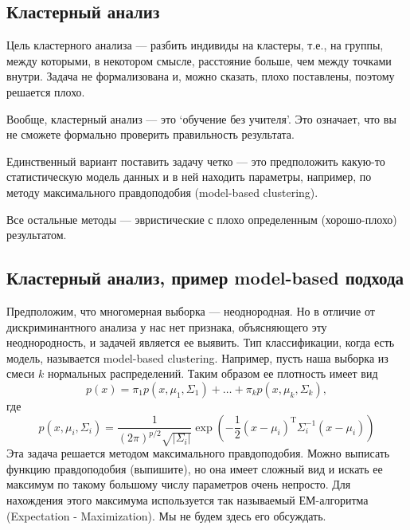 \subsection{Кластерный анализ}

Цель кластерного анализа --- разбить индивиды на кластеры, т.е., на группы, между которыми, в некотором смысле,
расстояние больше, чем между точками внутри. Задача не формализована и, можно сказать, плохо поставлены,
 поэтому решается плохо.

Вообще, кластерный анализ --- это `обучение без учителя'. Это означает, что вы не сможете формально проверить правильность результата.

Единственный вариант поставить задачу четко --- это предположить какую-то статистическую модель данных и в ней находить
параметры, например, по методу максимального правдоподобия  (model-based clustering).

Все остальные методы --- эвристические с плохо определенным (хорошо-плохо) результатом.

\subsection{Кластерный	анализ,	пример	model-based	подхода}

Предположим, что многомерная выборка --- неоднородная. Но в отличие от дискриминантного анализа у нас нет признака, объясняющего эту неоднородность, и задачей является ее выявить.
Тип классификации, когда есть модель, называется model-based clustering.
Например, пусть наша выборка из смеси $k$ нормальных распределений. Таким образом ее плотность имеет вид
\begin{equation}
p(x) = \pi_1 p(x, \mu_1, \Sigma_1) + \ldots + \pi_k p(x, \mu_k, \Sigma_k),
\end{equation}
где
\begin{equation}
p(x, \mu_i, \Sigma_i) = \frac{1}{(2\pi)^{p/2}\sqrt{|\Sigma_i|}}
\exp \left(-\frac{1}{2}(x - \mu_i)^\mathrm{T}\Sigma_i^{-1}(x - \mu_i) \right)
\end{equation}
Эта задача решается методом максимального правдоподобия. Можно выписать функцию правдоподобия (выпишите),
но она имеет сложный вид и искать ее максимум по такому большому числу параметров очень непросто.
Для нахождения этого максимума используется так называемый ЕМ-алгоритма (Expectation - Maximization).
Мы не будем здесь его обсуждать.



